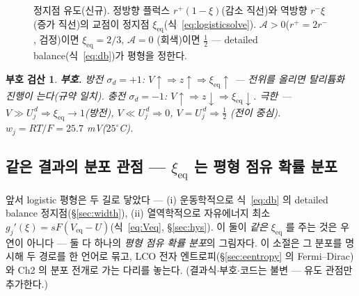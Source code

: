 \documentclass[11pt,a4paper]{article}
\newtheorem*{signbox}{부호 검산}
\newcommand{\eq}{\mathrm{eq}}
\begin{document}
\begin{figure}[t]
\centering
{}
\caption{정지점 유도(신규). 정방향 플럭스 $r^+(1-\xi)$(감소 직선)와 역방향 $r^-\xi$(증가 직선)의 교점이 정지점
$\xi_\eq$(식~\eqref{eq:logisticsolve}). $\mathcal A>0$($r^+=2r^-$, 검정)이면 $\xi_\eq=2/3$, $\mathcal A=0$
(회색)이면 $\tfrac12$ — detailed balance(식~\eqref{eq:db})가 평형을 정한다.}
\label{fig:flux}
\end{figure}

\begin{signbox}
\textbf{부호.} 방전 $\sigma_d=+1$: $V\!\uparrow\Rightarrow z\!\uparrow\Rightarrow\xi_\eq\!\uparrow$ — 전위를 올리면
탈리튬화 진행이 는다(규약 일치). 충전 $\sigma_d=-1$: $V\!\uparrow\Rightarrow z\!\downarrow\Rightarrow\xi_\eq\!\downarrow$.
극한 — $V\gg U_j^{\,d}\Rightarrow\xi_\eq\to1$(방전), $V\ll U_j^{\,d}\Rightarrow0$, $V=U_j^{\,d}\Rightarrow\tfrac12$
(전이 중심). $w_j=RT/F=25.7$ mV($25^\circ$C).
\end{signbox}

\subsection{같은 결과의 분포 관점 — $\xi_\eq$ 는 평형 점유 확률 분포}\label{sub:dist}
앞서 logistic 평형은 두 길로 닿았다 — (i) 운동학적으로 식~\eqref{eq:db} 의 detailed balance 정지점(\S\ref{sec:width}),
(ii) 열역학적으로 자유에너지 최소 $g_j'(\xi)=sF(V_\eq-U)$(식~\eqref{eq:Veq}, \S\ref{sec:hys}). 이 둘이 \emph{같은}
$\xi_\eq$ 를 주는 것은 우연이 아니다 — 둘 다 하나의 \emph{평형 점유 확률 분포}의 그림자다. 이 소절은 그 분포를 명시해
두 경로를 한 언어로 묶고, LCO 전자 엔트로피(\S\ref{sec:eentropy} 의 Fermi--Dirac)와 Ch2 의 분포 전개로 가는 다리를 놓는다.
(결과식$\cdot$부호$\cdot$코드는 불변 — 유도 관점만 추가한다.)
\end{document}
